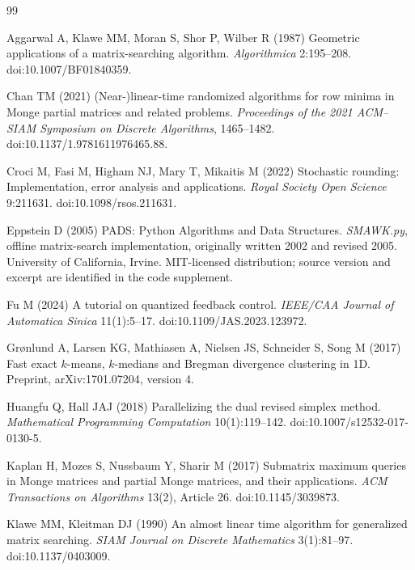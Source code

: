 \begin{thebibliography}{99}\raggedright
{}
Aggarwal A, Klawe MM, Moran S, Shor P, Wilber R (1987) Geometric applications of a matrix-searching algorithm. \emph{Algorithmica} 2:195--208. doi:10.1007/BF01840359.

Chan TM (2021) (Near-)linear-time randomized algorithms for row minima in Monge partial matrices and related problems. \emph{Proceedings of the 2021 ACM--SIAM Symposium on Discrete Algorithms}, 1465--1482. doi:10.1137/1.9781611976465.88.

Croci M, Fasi M, Higham NJ, Mary T, Mikaitis M (2022) Stochastic rounding: Implementation, error analysis and applications. \emph{Royal Society Open Science} 9:211631. doi:10.1098/rsos.211631.

Eppstein D (2005) PADS: Python Algorithms and Data Structures. \emph{SMAWK.py}, offline matrix-search implementation, originally written 2002 and revised 2005. University of California, Irvine. MIT-licensed distribution; source version and excerpt are identified in the code supplement.

Fu M (2024) A tutorial on quantized feedback control. \emph{IEEE/CAA Journal of Automatica Sinica} 11(1):5--17. doi:10.1109/JAS.2023.123972.

Gr{\o}nlund A, Larsen KG, Mathiasen A, Nielsen JS, Schneider S, Song M (2017) Fast exact $k$-means, $k$-medians and Bregman divergence clustering in 1D. Preprint, arXiv:1701.07204, version 4.

Huangfu Q, Hall JAJ (2018) Parallelizing the dual revised simplex method. \emph{Mathematical Programming Computation} 10(1):119--142. doi:10.1007/s12532-017-0130-5.

Kaplan H, Mozes S, Nussbaum Y, Sharir M (2017) Submatrix maximum queries in Monge matrices and partial Monge matrices, and their applications. \emph{ACM Transactions on Algorithms} 13(2), Article 26. doi:10.1145/3039873.

Klawe MM, Kleitman DJ (1990) An almost linear time algorithm for generalized matrix searching. \emph{SIAM Journal on Discrete Mathematics} 3(1):81--97. doi:10.1137/0403009.


\end{thebibliography}
